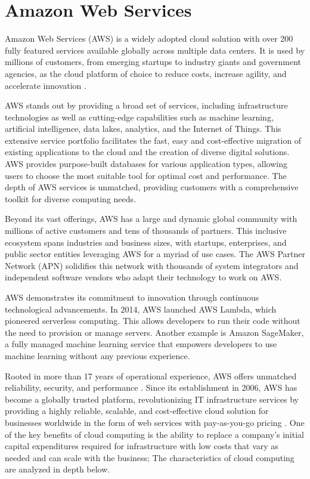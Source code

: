 \section{Amazon Web Services}

Amazon Web Services (AWS) is a widely adopted cloud solution with over 200 fully featured services available globally across multiple data centers. It is used by millions of customers, from emerging startups to industry giants and government agencies, as the cloud platform of choice to reduce costs, increase agility, and accelerate innovation \cite{EuAmazonWebServices}.

AWS stands out by providing a broad set of services, including infrastructure technologies as well as cutting-edge capabilities such as machine learning, artificial intelligence, data lakes, analytics, and the Internet of Things. This extensive service portfolio facilitates the fast, easy and cost-effective migration of existing applications to the cloud and the creation of diverse digital solutions. AWS provides purpose-built databases for various application types, allowing users to choose the most suitable tool for optimal cost and performance. The depth of AWS services is unmatched, providing customers with a comprehensive toolkit for diverse computing needs.

Beyond its vast offerings, AWS has a large and dynamic global community with millions of active customers and tens of thousands of partners. This inclusive ecosystem spans industries and business sizes, with startups, enterprises, and public sector entities leveraging AWS for a myriad of use cases. The AWS Partner Network (APN) solidifies this network with thousands of system integrators and independent software vendors who adapt their technology to work on AWS.

AWS demonstrates its commitment to innovation through continuous technological advancements. In 2014, AWS launched AWS Lambda, which pioneered serverless computing. This allows developers to run their code without the need to provision or manage servers. Another example is Amazon SageMaker, a fully managed machine learning service that empowers developers to use machine learning without any previous experience.

Rooted in more than 17 years of operational experience, AWS offers unmatched reliability, security, and performance \cite{WhatIsAWS}. Since its establishment in 2006, AWS has become a globally trusted platform, revolutionizing IT infrastructure services by providing a highly reliable, scalable, and cost-effective cloud solution for businesses worldwide in the form of web services with pay-as-you-go pricing \cite{AboutAWS}. One of the key benefits of cloud computing is the ability to replace a company's initial capital expenditures required for infrastructure with low costs that vary as needed and can scale with the business; The characteristics of cloud computing are analyzed in depth below.

